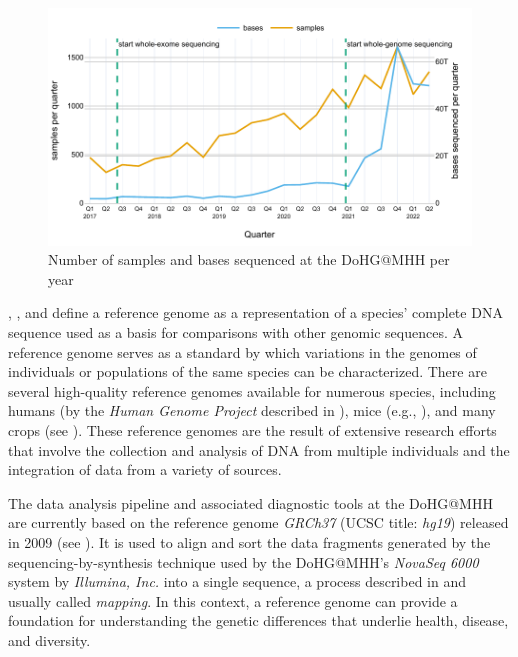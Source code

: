 \begin{figure}[H]
    \centering
    \includegraphics[width=\linewidth,height=\textheight,keepaspectratio]{sequenced_samples_and_bases}
    \caption[Number of samples and bases sequenced at the \acs{DoHG@MHH}]{Number of samples and bases sequenced at the \acl{DoHG@MHH} per year}
    \label{figure:sequenced_samples_and_bases}
\end{figure}

\citeauthor{Palladino2002} \autocite[p. 15]{Palladino2002}, \citeauthor{Patel2018} \autocite{Patel2018}, and \citeauthor{Caetano-Anolles2022} \autocite{Caetano-Anolles2022} define a reference genome as a representation of a species' complete DNA sequence used as a basis for comparisons with other genomic sequences. A reference genome serves as a standard by which variations in the genomes of individuals or populations of the same species can be characterized. There are several high-quality reference genomes available for numerous species, including humans (by the \textit{Human Genome Project} described in \autocite{Collins2003}), mice (e.g., \autocite{Lilue2018}), and many crops (see \autocite{Morrell2012}). These reference genomes are the result of extensive research efforts that involve the collection and analysis of DNA from multiple individuals and the integration of data from a variety of sources.

The data analysis pipeline and associated diagnostic tools at the \ac{DoHG@MHH} are currently based on the reference genome \textit{GRCh37} (\ac{UCSC} title: \textit{hg19}) released in 2009 (see \autocite{NLM2009}). It is used to align and sort the data fragments generated by the sequencing-by-synthesis technique used by the \ac{DoHG@MHH}'s \textit{NovaSeq 6000} \autocite{IlluminaInc.2022a} system by \textit{Illumina, Inc.} into a single sequence, a process described in \autocites{Holt2008}{Li2008}{Fuller2009} and usually called \textit{mapping}. In this context, a reference genome can provide a foundation for understanding the genetic differences that underlie health, disease, and diversity. 

